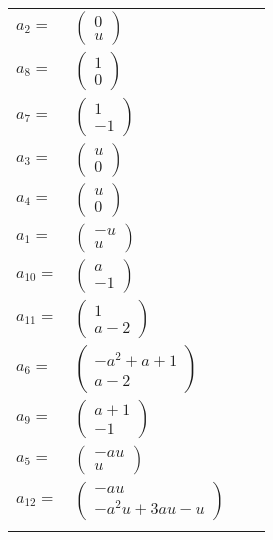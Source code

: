 \documentclass[1p]{elsarticle_modified}
\theoremstyle{definition}
\begin{document}
\begin{tabular}{m{7pt} m{180pt} m{7pt} m{180pt} }
\flushright $a_{2}=$&$\begin{pmatrix}0\\u\end{pmatrix}$ \\
\flushright $a_{8}=$&$\begin{pmatrix}1\\0\end{pmatrix}$ \\
\flushright $a_{7}=$&$\begin{pmatrix}1\\-1\end{pmatrix}$ \\
\flushright $a_{3}=$&$\begin{pmatrix}u\\0\end{pmatrix}$ \\
\flushright $a_{4}=$&$\begin{pmatrix}u\\0\end{pmatrix}$ \\
\flushright $a_{1}=$&$\begin{pmatrix}- u\\u\end{pmatrix}$ \\
\flushright $a_{10}=$&$\begin{pmatrix}a\\-1\end{pmatrix}$ \\
\flushright $a_{11}=$&$\begin{pmatrix}1\\a-2\end{pmatrix}$ \\
\flushright $a_{6}=$&$\begin{pmatrix}- a^2+a+1\\a-2\end{pmatrix}$ \\
\flushright $a_{9}=$&$\begin{pmatrix}a+1\\-1\end{pmatrix}$ \\
\flushright $a_{5}=$&$\begin{pmatrix}- a u\\u\end{pmatrix}$ \\
\flushright $a_{12}=$&$\begin{pmatrix}- a u\\- a^2 u+3 a u- u\end{pmatrix}$\\&\end{tabular}
\end{document}
